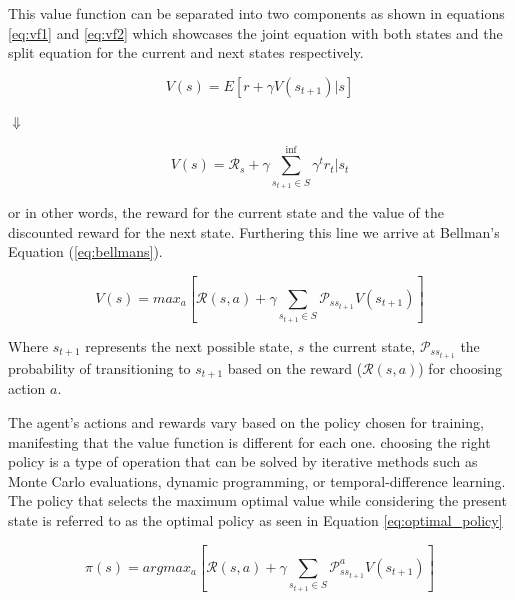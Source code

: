 This value function can be separated into two components as shown in equations \ref{eq:vf1} and \ref{eq:vf2} which showcases the joint equation with both states and the split equation for the current and next states respectively.

\begin{equation}
    \label{eq:vf1}
    V(s) = E [r + \gamma V(s_{t+1})|s]
\end{equation}

\begin{center}
    $\Downarrow$
\end{center}

\begin{equation}
    \label{eq:vf2}
    V(s) = \mathcal{R}_s + \gamma \sum_{s_{t+1} \in S}^{\inf}\gamma^t r_t|s_t
\end{equation}


or in other words, the reward for the current state and the value of the discounted reward for the next state. Furthering this line we arrive at  Bellman's Equation (\ref{eq:bellmans}).

\begin{equation}
    \label{eq:bellmans}
    V(s) = max_a[ \mathcal{R}(s,a) + \gamma \sum_{s_{t+1} \in  S}\mathcal{P}_{ss_{t+1}} V(s_{t+1})]
\end{equation}

Where $s_{t+1}$ represents the next possible state, $s$ the current state, $\mathcal{P}_{ss_{t+1}}$ the probability of transitioning to $s_{t+1}$  based on the reward ($\mathcal{R}(s,a)$) for choosing action $a$.

The agent's actions and rewards vary based on the policy chosen for training, manifesting that the value function is different for each one. choosing the right policy is a type of operation that can be solved by iterative methods such as Monte Carlo evaluations, dynamic programming, or temporal-difference learning. The policy that selects the maximum optimal value while considering the present state is referred to as the optimal policy as seen in Equation \ref{eq:optimal_policy}

\begin{equation}
    \label{eq:optimal_policy}
    \pi(s) = argmax_a[\mathcal{R}(s,a) + \gamma \sum_{s_{t+1} \in S}\mathcal{P}_{ss_{t+1}}^a V(s_{t+1})]
\end{equation}

